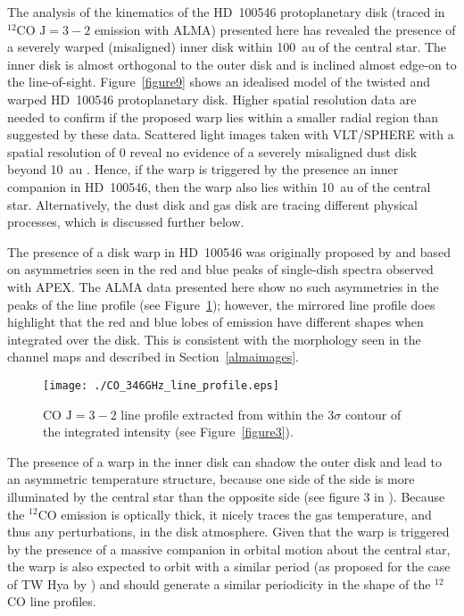\documentclass[onecolumn]{aastex6}
\begin{document}
The analysis of the kinematics of the HD~100546 protoplanetary disk
(traced in $^{12}$CO $\mathrm{J}=3-2$ emission with ALMA) presented here has revealed the
presence of a severely warped (misaligned) inner disk within 100~au of the central star.
The inner disk is almost orthogonal to the outer disk and is inclined almost edge-on to the
line-of-sight.
Figure~\ref{figure9} shows an idealised model of the twisted and warped HD~100546
protoplanetary disk.
Higher spatial resolution data are needed to confirm if the proposed warp
lies within a smaller radial region than suggested by these data.
Scattered light images taken with VLT/SPHERE with a spatial resolution
of 0 reveal no evidence of a severely misaligned
dust disk beyond 10~au \citep{garufi16}.
Hence, if the warp is triggered by the presence an inner
companion in HD~100546, then
the warp also lies within 10~au of the central star.
Alternatively, the dust disk and gas disk are tracing different
physical processes, which is discussed further below.

The presence of a disk warp in HD~100546 was originally
proposed by \citep{panic10} and based on asymmetries seen
in the red and blue peaks of single-dish spectra
observed with APEX.
The ALMA data presented here show no such asymmetries in the
peaks of the line profile (see Figure~\ref{figure10}); however,
the mirrored line profile does highlight that the red and blue
lobes of emission have different shapes when integrated over the disk.
This is consistent with the morphology seen in the channel maps
and described in Section~\ref{almaimages}.


\begin{figure}[]
\centering
\texttt{[image: ./CO\_346GHz\_line\_profile.eps]}
\caption{CO $\mathrm{J}=3-2$ line profile extracted from within the
$3\sigma$ contour of the integrated intensity (see Figure~\ref{figure3}).}
\label{figure10}
\end{figure}

The presence of a warp in the inner disk
can shadow the outer disk and lead to an asymmetric temperature structure,
because one side of the side is more illuminated by the central star
than the opposite side (see figure 3 in \citealt{panic10}).
Because the $^{12}$CO emission is optically thick, it nicely traces
the gas temperature, and thus any perturbations, in the disk atmosphere.
Given that the warp is triggered by the presence of a massive companion
in orbital motion about the central star, the warp is also expected to orbit
with a similar period (as proposed for the case of TW Hya by
\citealt{debes17}) and should generate a similar periodicity
in the shape of the $^{12}$CO line profiles.
\end{document}

